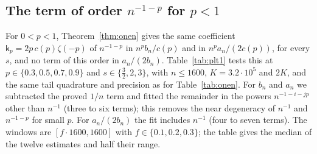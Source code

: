 \subsection{\texorpdfstring{The term of order $n^{-1-p}$ for $p<1$}{The term of order n\textasciicircum(-1-p) for p<1}}
For $0<p<1$, Theorem~\ref{thm:onen} gives the same coefficient $\mathsf k_p=2p\,c(p)\zeta(-p)$ of $n^{-1-p}$ in
$n^pb_n/c(p)$ and in $n^pa_n/(2c(p))$, for every $s$, and no term of this order in $a_n/(2b_n)$. Table~\ref{tab:plt1}
tests this at $p\in\{0.3,0.5,0.7,0.9\}$ and $s\in\{\frac32,2,3\}$, with $n\le1600$, $K=3.2\cdot10^5$ and $2K$, and the
same tail quadrature and precision as for Table~\ref{tab:onen}. For $b_n$ and $a_n$ we subtracted the proved $1/n$ term
and fitted the remainder in the powers $n^{-1-i-jp}$ other than $n^{-1}$ (three to six terms); this removes the near
degeneracy of $n^{-1}$ and $n^{-1-p}$ for small $p$. For $a_n/(2b_n)$ the fit includes $n^{-1}$ (four to seven terms).
The windows are $[f\cdot1600,1600]$ with $f\in\{0.1,0.2,0.3\}$; the table gives the median of the twelve estimates and
half their range.

